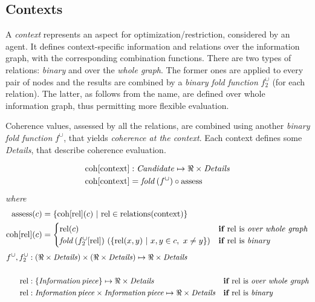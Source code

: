 \documentclass[../ThesisDoc]{subfiles}
\begin{document}
\providecommand{\rootdir}{..}


\subsection{Contexts}
\label{sec:solution-contexts}


A \emph{context} represents an aspect for optimization/restriction, considered
by an agent. It defines context-specific information and relations over the
information graph, with the corresponding combination functions. There are
two types of relations: \emph{binary} and over the \emph{whole graph}.
The former ones are applied to every pair of nodes and the results are combined
by a \emph{binary fold function} $f^\cup_2$ (for each relation).
The latter, as follows from the name, are defined over whole information graph,
thus permitting more flexible evaluation.

Coherence values, assessed by all the relations, are combined using another
\emph{binary fold function} $f^\cup$, that yields \emph{coherence at the context}.
Each context defines some \emph{Details}, that describe coherence evaluation.

\begin{align}
\begin{split}
  \mathrm{coh}[\mathrm{context}] &: \mathit{Candidate} \mapsto \Re \times \mathit{Details} \\
  \mathrm{coh}[\mathrm{context}] &= \mathit{fold}\,(f^\cup) \circ \mathrm{assess}
\end{split}
\end{align}
\emph{where}
\begin{align*}
    \mathrm{assess}(c) &=
      \lbrace \mathrm{coh}[\mathrm{rel}](c) ~|~ \mathrm{rel} \in \mathrm{relations}(\mathrm{context})
      \rbrace\\
    \mathrm{coh}[\mathrm{rel}](c) &= \begin{cases}
                       \mathrm{rel}(c) & \textbf{if } \mathrm{rel} \text{ is \emph{over whole graph}}
                       \\
                       \mathit{fold}\, (f^\cup_2[\mathrm{rel}]) ~
                                (\lbrace \mathrm{rel}(x,y) ~|~ x,y \in c, ~ x \not= y
                                 \rbrace)
                          & \textbf{if } \mathrm{rel} \text{ is \emph{binary}}
                     \end{cases}
\end{align*}
\begin{align*}
  f^\cup, f^\cup_2 &: (\Re \times \mathit{Details}) \times (\Re \times \mathit{Details})
                      \mapsto \Re \times \mathit{Details} & &
  \\ \\
  \mathrm{rel} &:\lbrace \mathit{Information\,piece} \rbrace
              \mapsto \Re \times \mathit{Details}
       & \textbf{if } & \mathrm{rel} \text{ is \emph{over whole graph}}
  \\
  \mathrm{rel} &:\mathit{Information\,piece} \times \mathit{Information\,piece}
              \mapsto \Re \times \mathit{Details}
       & \textbf{if } & \mathrm{rel} \text{ is \emph{binary}}
\end{align*}
\end{document}
